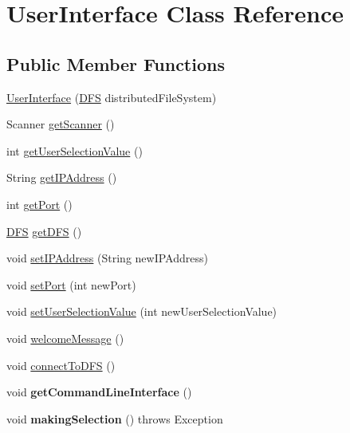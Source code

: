\hypertarget{class_user_interface}{}\section{User\+Interface Class Reference}
\label{class_user_interface}
\subsection*{Public Member Functions}
\begin{DoxyCompactItemize}
\item 
\mbox{\hyperlink{class_user_interface_ae4be0a3dc956ead335dbb0c627847b1f}{User\+Interface}} (\mbox{\hyperlink{class_d_f_s}{D\+FS}} distributed\+File\+System)
\item 
Scanner \mbox{\hyperlink{class_user_interface_a73a95f25426d17a82f506bfa546ffc21}{get\+Scanner}} ()
\item 
int \mbox{\hyperlink{class_user_interface_ad83d86cf79d6766eaf8acbc4453c9abe}{get\+User\+Selection\+Value}} ()
\item 
String \mbox{\hyperlink{class_user_interface_a2fda154134eb10db7b184de5a6df5b23}{get\+I\+P\+Address}} ()
\item 
int \mbox{\hyperlink{class_user_interface_af046587dab904a279c4bde6df3fba567}{get\+Port}} ()
\item 
\mbox{\hyperlink{class_d_f_s}{D\+FS}} \mbox{\hyperlink{class_user_interface_a6ccb02994e74e468304c7c990d83913a}{get\+D\+FS}} ()
\item 
void \mbox{\hyperlink{class_user_interface_a4e49fde80d037d038d9c73db9d04e196}{set\+I\+P\+Address}} (String new\+I\+P\+Address)
\item 
void \mbox{\hyperlink{class_user_interface_af822b7fc2dbee940ad4892bd2e27d5ae}{set\+Port}} (int new\+Port)
\item 
void \mbox{\hyperlink{class_user_interface_ae26a8337ddbf851a470c112df194a768}{set\+User\+Selection\+Value}} (int new\+User\+Selection\+Value)
\item 
void \mbox{\hyperlink{class_user_interface_a8541dc8e6383dfdf708f3307b77d3e83}{welcome\+Message}} ()
\item 
void \mbox{\hyperlink{class_user_interface_ac366637e9291b357f85f67a58070e666}{connect\+To\+D\+FS}} ()
\item 
\mbox{\label{class_user_interface_a18a2dc6897c3ef551c1d433116b712d1}} 
void {\bfseries get\+Command\+Line\+Interface} ()
\item 
\mbox{\label{class_user_interface_a8f5f6e741f0ecc16317d6425fc13ae09}} 
void {\bfseries making\+Selection} ()  throws Exception 
\end{DoxyCompactItemize}


